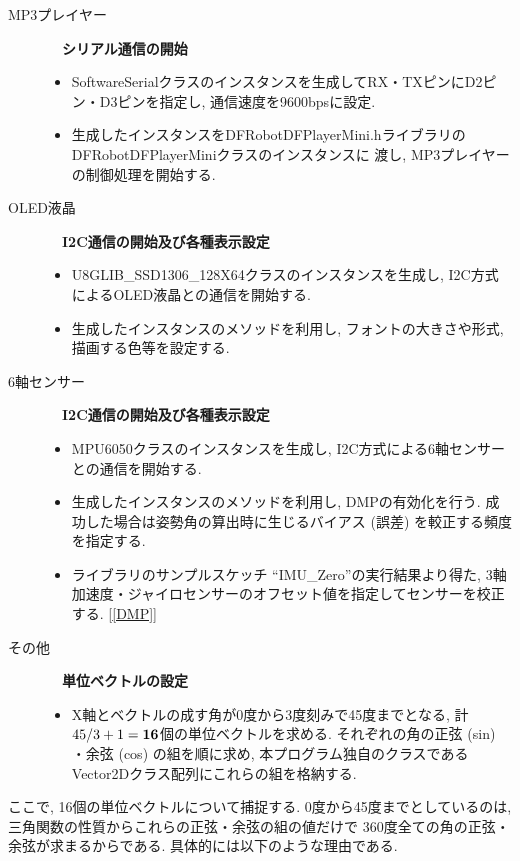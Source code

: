 \documentclass[10pt]{jsarticle}
\newcommand{\bm}[1]{{\mbox{\boldmath $#1$}}}
\begin{document}
\begin{description}
\item[MP3プレイヤー]　\textbf{シリアル通信の開始}
		\begin{itemize}
		\item	SoftwareSerialクラスのインスタンスを生成してRX・TXピンにD2ピン・D3ピンを指定し, 
				通信速度を9600bpsに設定.
		\item	生成したインスタンスをDFRobotDFPlayerMini.hライブラリのDFRobotDFPlayerMiniクラスのインスタンスに
				渡し, MP3プレイヤーの制御処理を開始する.
		\end{itemize}
	
\item[OLED液晶]　\textbf{I2C通信の開始及び各種表示設定}
		\begin{itemize}
		\item	U8GLIB\_SSD1306\_128X64クラスのインスタンスを生成し, 
				I2C方式によるOLED液晶との通信を開始する.
		\item	生成したインスタンスのメソッドを利用し, フォントの大きさや形式, 描画する色等を設定する.
		\end{itemize}
	
\item[6軸センサー]　\textbf{I2C通信の開始及び各種表示設定}
		\begin{itemize}
		\item	MPU6050クラスのインスタンスを生成し, I2C方式による6軸センサーとの通信を開始する.
		\item	生成したインスタンスのメソッドを利用し, DMPの有効化を行う.
				成功した場合は姿勢角の算出時に生じるバイアス (誤差) を較正する頻度を指定する.
		\item	ライブラリのサンプルスケッチ ``IMU\_Zero''の実行結果より得た, 
				3軸加速度・ジャイロセンサーのオフセット値を指定してセンサーを校正する.	[\ref{DMP}]
		\end{itemize}
	
\item[その他]　\textbf{単位ベクトルの設定}
		\begin{itemize}
		\item	X軸とベクトルの成す角が0度から3度刻みで45度までとなる, 計$45/3+1=\bm{16}$個の単位ベクトルを求める.
				それぞれの角の正弦 (sin) ・余弦 (cos) の組を順に求め, 
				本プログラム独自のクラスであるVector2Dクラス配列にこれらの組を格納する.
		\end{itemize}
	
\end{description}

ここで, 16個の単位ベクトルについて捕捉する.
0度から45度までとしているのは, 三角関数の性質からこれらの正弦・余弦の組の値だけで
360度全ての角の正弦・余弦が求まるからである.
具体的には以下のような理由である.
\end{document}
